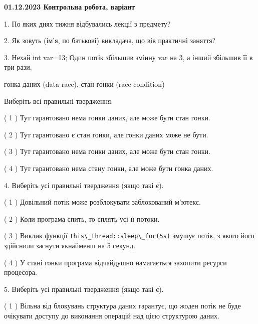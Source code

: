 \documentclass[12pt, ukrainian]{article}
\def\code#1{\Verb!#1!}
\begin{document}
\vspace{4mm}
\newpage
\begin {large}

\textbf{01.12.2023 Контрольна робота, варіант  }\par


{
1. По яких днях тижня відбувались лекції з предмету?



\vspace{5mm}
2. Як зовуть (ім'я, по батькові) викладача, що вів практичні заняття?



\vspace{5mm}
3. Нехай int var=13; Один потік збільшив змінну var на 3, а інший збільшив її в три рази.

гонка даних (data race), стан гонки (race condition)

Виберіть всі правильні твердження.\par
\vspace{2mm}
( 1 ) Тут гарантовано нема гонки даних, але може бути стан гонки.%

( 2 ) Тут гарантовано є стан гонки, але гонки даних може не бути.%

( 3 ) Тут гарантовано нема гонки даних, але може бути стан гонки.%

( 4 ) Тут гарантовано нема стану гонки, але може бути гонка даних.%


\vspace{5mm}
4. Виберіть усі правильні твердження (якщо такі є).\par
\vspace{2mm}

( 1 ) Довільний потік може розблокувати заблокований м’ютекс.%

( 2 ) Коли програма спить, то сплять усі її потоки.%

( 3 ) Виклик функції \code{this\_thread::sleep\_for(5s)} змушує потік, з якого його здійснили заснути якнайменш на 5 секунд.%

( 4 ) У стані гонки програма відчайдушно намагається захопити ресурси процесора.%


\vspace{5mm}
5. Виберіть усі правильні твердження (якщо такі є).\par
\vspace{2mm}

( 1 ) Вільна від блокувань структура даних гарантує, що жоден потік не буде очікувати доступу до виконання операцій над цією структурою даних.%

}
\end{large}
\end{document}
